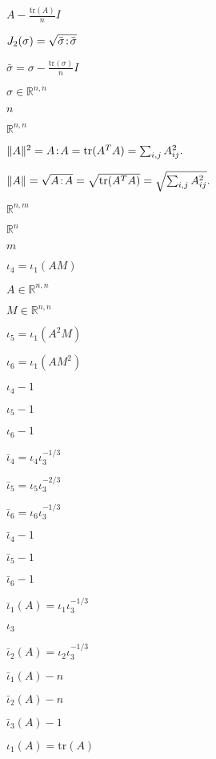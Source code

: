 \documentclass{article}
\begin{document}
$ A - \frac{\mathrm{tr}(A)}{n}I $
\pagebreak

$ J_2(\sigma)=\sqrt{\bar\sigma\negthinspace:\negthinspace\bar\sigma} $
\pagebreak

$\bar\sigma = \sigma - \frac{\mathrm{tr}(\sigma)}{n}I$
\pagebreak

$\sigma\in\mathbb{R}^{n,n}$
\pagebreak

$n$
\pagebreak

$\mathbb{R}^{n,n}$
\pagebreak

$ \|A\|^2 = A\negthinspace : \negthinspace A = \mathrm{tr}(A^TA) = \sum_{i,j} A_{ij}^2. $
\pagebreak

$ \|A\| = \sqrt{A\negthinspace : \negthinspace A }= \sqrt{\mathrm{tr}(A^TA)} = \sqrt{\sum_{i,j} A_{ij}^2}. $
\pagebreak

$\mathbb{R}^{n,m}$
\pagebreak

$\mathbb{R}^n$
\pagebreak

$m$
\pagebreak

$ \iota_4=\iota_1(AM) $
\pagebreak

$A\in\mathbb{R}^{n,n}$
\pagebreak

$M\in\mathbb{R}^{n,n}$
\pagebreak

$ \iota_5=\iota_1(A^2M) $
\pagebreak

$ \iota_6=\iota_1(AM^2) $
\pagebreak

$ \iota_4 - 1 $
\pagebreak

$ \iota_5 - 1 $
\pagebreak

$ \iota_6 - 1 $
\pagebreak

$\bar\iota_4=\iota_4\iota_3^{-1/3}$
\pagebreak

$\bar\iota_5=\iota_5\iota_3^{-2/3}$
\pagebreak

$\bar\iota_6=\iota_6\iota_3^{-1/3}$
\pagebreak

$ \bar\iota_4 - 1 $
\pagebreak

$ \bar\iota_5 - 1 $
\pagebreak

$ \bar\iota_6 - 1 $
\pagebreak

$ \bar\iota_1(A)=\iota_1\iota_3^{-1/3} $
\pagebreak

$\iota_3$
\pagebreak

$ \bar\iota_2(A)=\iota_2\iota_3^{-1/3} $
\pagebreak

$ \bar\iota_1(A) - n $
\pagebreak

$ \bar\iota_2(A) - n $
\pagebreak

$ \bar\iota_3(A) - 1 $
\pagebreak

$ \iota_1(A)=\mathrm{tr}(A) $
\pagebreak
\end{document}
